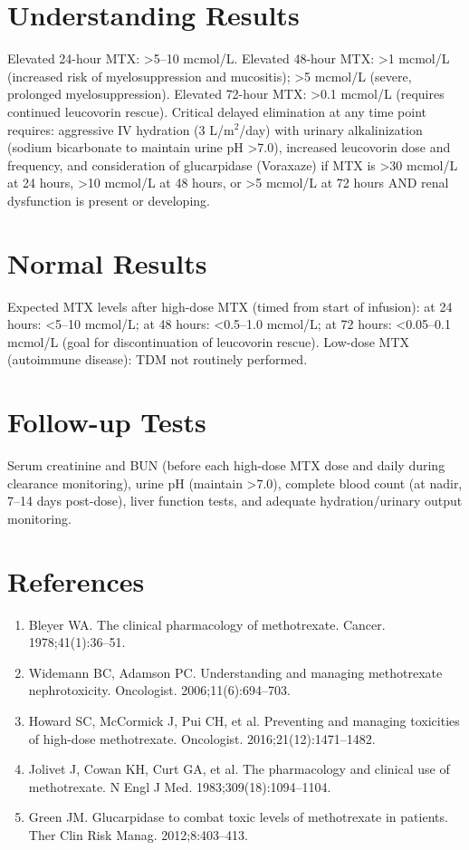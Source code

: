 \section*{Understanding Results}
Elevated 24-hour MTX: >5--10 mcmol/L. Elevated 48-hour MTX: >1 mcmol/L (increased risk of myelosuppression and mucositis); >5 mcmol/L (severe, prolonged myelosuppression). Elevated 72-hour MTX: >0.1 mcmol/L (requires continued leucovorin rescue). Critical delayed elimination at any time point requires: aggressive IV hydration (3 L/m$^2$/day) with urinary alkalinization (sodium bicarbonate to maintain urine pH >7.0), increased leucovorin dose and frequency, and consideration of glucarpidase (Voraxaze) if MTX is >30 mcmol/L at 24 hours, >10 mcmol/L at 48 hours, or >5 mcmol/L at 72 hours AND renal dysfunction is present or developing.
\section*{Normal Results}
Expected MTX levels after high-dose MTX (timed from start of infusion): at 24 hours: <5--10 mcmol/L; at 48 hours: <0.5--1.0 mcmol/L; at 72 hours: <0.05--0.1 mcmol/L (goal for discontinuation of leucovorin rescue). Low-dose MTX (autoimmune disease): TDM not routinely performed.
\section*{Follow-up Tests}
Serum creatinine and BUN (before each high-dose MTX dose and daily during clearance monitoring), urine pH (maintain >7.0), complete blood count (at nadir, 7--14 days post-dose), liver function tests, and adequate hydration/urinary output monitoring.
\section*{References}
\begin{enumerate}
  \item Bleyer WA. The clinical pharmacology of methotrexate. Cancer. 1978;41(1):36--51.
  \item Widemann BC, Adamson PC. Understanding and managing methotrexate nephrotoxicity. Oncologist. 2006;11(6):694--703.
  \item Howard SC, McCormick J, Pui CH, et al. Preventing and managing toxicities of high-dose methotrexate. Oncologist. 2016;21(12):1471--1482.
  \item Jolivet J, Cowan KH, Curt GA, et al. The pharmacology and clinical use of methotrexate. N Engl J Med. 1983;309(18):1094--1104.
  \item Green JM. Glucarpidase to combat toxic levels of methotrexate in patients. Ther Clin Risk Manag. 2012;8:403--413.
\end{enumerate}
\clearpage
